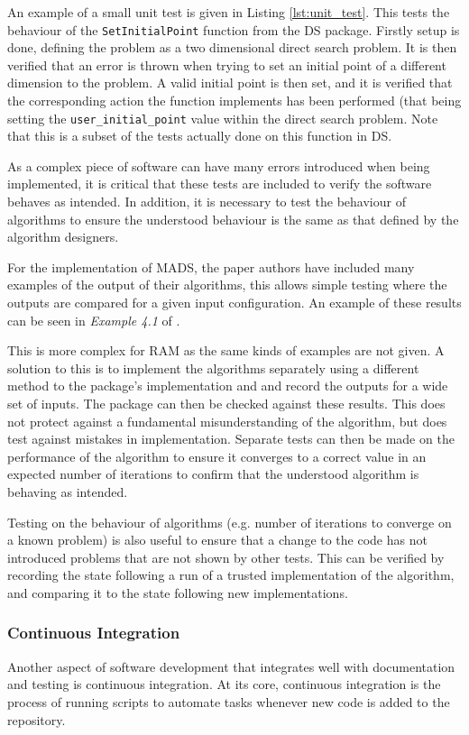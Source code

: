 An example of a small unit test is given in Listing \ref{lst:unit_test}. This tests the behaviour of the \texttt{SetInitialPoint} function from the \ac{DS} package. Firstly setup is done, defining the problem as a two dimensional direct search problem. It is then verified that an error is thrown when trying to set an initial point of a different dimension to the problem. A valid initial point is then set, and it is verified that the corresponding action the function implements has been performed (that being setting the \texttt{user\_initial\_point} value within the direct search problem. Note that this is a subset of the tests actually done on this function in \ac{DS}.

As a complex piece of software can have many errors introduced when being implemented, it is critical that these tests are included to verify the software behaves as intended. In addition, it is necessary to test the behaviour of algorithms to ensure the understood behaviour is the same as that defined by the algorithm designers. 

For the implementation of \ac{MADS}, the paper authors have included many examples of the output of their algorithms, this allows simple testing where the outputs are compared for a given input configuration. An example of these results can be seen in \textit{Example 4.1} of \cite{Audet2007MeshOptimization}.

This is more complex for \ac{RAM} as the same kinds of examples are not given. A solution to this is to implement the algorithms separately using a different method to the package's implementation and and record the outputs for a wide set of inputs. The package can then be checked against these results. This does not protect against a fundamental misunderstanding of the algorithm, but does test against mistakes in implementation. Separate tests can then be made on the performance of the algorithm to ensure it converges to a correct value in an expected number of iterations to confirm that the understood algorithm is behaving as intended.

Testing on the behaviour of algorithms (e.g. number of iterations to converge on a known problem) is also useful to ensure that a change to the code has not introduced problems that are not shown by other tests. This can be verified by recording the state following a run of a trusted implementation of the algorithm, and comparing it to the state following new implementations. 

\subsubsection{Continuous Integration}
Another aspect of software development that integrates well with documentation and testing is continuous integration. At its core, continuous integration is the process of running scripts to automate tasks whenever new code is added to the repository. 

